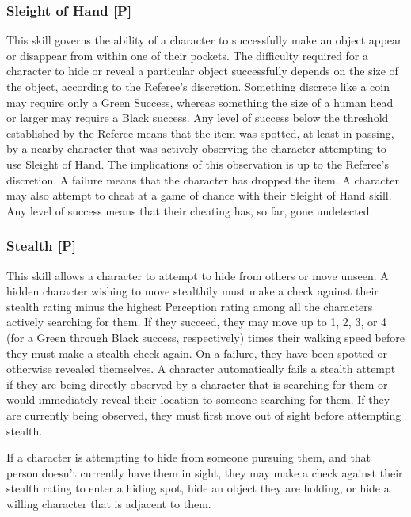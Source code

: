 \documentclass[oneside]{book}
\begin{document}
\begin{multicols}{2}
\subsubsection{Sleight of Hand [P]}
This skill governs the ability of a character to successfully make an object appear or disappear from within one of their pockets. The difficulty required for a character to hide or reveal a particular object successfully depends on the size of the object, according to the Referee's discretion. Something discrete like a coin may require only a Green Success, whereas something the size of a human head or larger may require a Black success. Any level of success below the threshold established by the Referee means that the item was spotted, at least in passing, by a nearby character that was actively observing the character attempting to use Sleight of Hand. The implications of this observation is up to the Referee's discretion. A failure means that the character has dropped the item. A character may also attempt to cheat at a game of chance with their Sleight of Hand skill. Any level of success means that their cheating has, so far, gone undetected. 


\subsubsection{Stealth [P]}
This skill allows a character to attempt to hide from others or move unseen. A hidden character wishing to move stealthily must make a check against their stealth rating minus the highest Perception rating among all the characters actively searching for them. If they succeed, they may move up to 1, 2, 3, or 4 (for a Green through Black success, respectively) times their walking speed before they must make a stealth check again. On a failure, they have been spotted or otherwise revealed themselves. A character automatically fails a stealth attempt if they are being directly observed by a character that is searching for them or would immediately reveal their location to someone searching for them. If they are currently being observed, they must first move out of sight before attempting stealth. 

If a character is attempting to hide from someone pursuing them, and that person doesn't currently have them in sight, they may make a check against their stealth rating to enter a hiding spot, hide an object they are holding, or hide a willing character that is adjacent to them.


\end{multicols}
\end{document}

